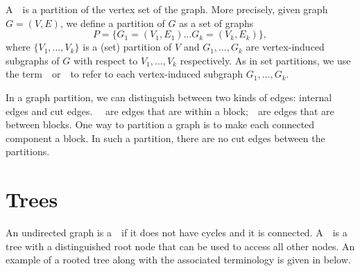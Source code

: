 \begin{cluster}
\label{grp:def:bg::graphs::partition}

\begin{definition}
\label{def:bg::graphs::partition}
A~~is a partition of the vertex set of the
graph.
More precisely, given graph $G = (V,E)$, we define a partition of $G$
as a set of graphs 
\[
P = \{ G_1 = (V_1,E_1) \ldots G_k = (V_k,E_k) \},
\]
where $\{V_1, \ldots, V_k\}$ is a (set) partition of $V$ and $G_1,
\ldots, G_k$ are vertex-induced subgraphs of $G$ with respect to $V_1,
\ldots, V_k$ respectively.  
As in set partitions, we use the term~~or~~to
refer to each vertex-induced subgraph $G_1, \ldots, G_k$.

\end{definition}
\end{cluster}

\begin{cluster}
\label{grp:def:bg::graphs::partition::edges}

\begin{definition}
\label{def:bg::graphs::partition::edges}
In a graph partition, we can distinguish between two kinds of edges:
internal edges and cut edges. ~~are edges that
are within a block;~~are edges that are between
blocks.
One way to partition a graph is to make each connected component a
block. In such a partition, there are no cut edges between the
partitions.

\end{definition}
\end{cluster}


\section{Trees}
\label{sec:bg::graphs::trees}

\begin{cluster}
\label{grp:def:bg::graphs::tree}

\begin{definition}[Tree]
\label{def:bg::graphs::tree}
An undirected graph is a~~if it does not have cycles and it is
connected.  A~~is a tree with a distinguished root
node that can be used to access all other nodes.
An example of a rooted tree along with
the associated terminology is given in below.

\end{definition}
\end{cluster}

